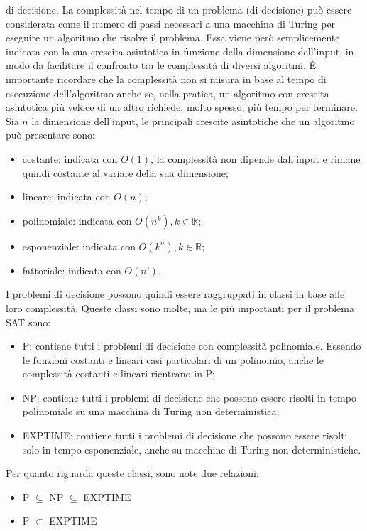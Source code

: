di decisione. La complessità nel tempo di un problema (di decisione) può essere considerata come il numero di passi necessari a una macchina di Turing
per eseguire un algoritmo che risolve il problema.
Essa viene però semplicemente indicata con la sua crescita asintotica in funzione della dimensione dell'input, 
in modo da facilitare il confronto tra le complessità di diversi algoritmi.
È importante ricordare che la complessità non si misura in base al tempo di esecuzione dell'algoritmo anche se,
nella pratica, un algoritmo con crescita asintotica più veloce di un altro richiede, molto spesso, più tempo per terminare.\\
Sia $n$ la dimensione dell'input, le principali crescite asintotiche che un algoritmo può presentare sono:
\begin{itemize}
    \item costante: indicata con $O(1)$, la complessità non dipende dall'input e rimane quindi costante al variare della sua dimensione;
    \item lineare: indicata con $O(n)$;
    \item polinomiale: indicata con $O(n^k), k \in \mathbb{R}$;
    \item esponenziale: indicata con $O(k^n), k \in \mathbb{R}$; 
    \item fattoriale: indicata con $O(n!)$.
\end{itemize}
I problemi di decisione possono quindi essere raggruppati in classi in base alle loro complessità. Queste classi sono molte, ma le 
più importanti per il problema SAT sono:
\begin{itemize}
    \item P: contiene tutti i problemi di decisione con complessità polinomiale. Essendo le funzioni costanti e lineari casi particolari di un polinomio,
    anche le complessità costanti e lineari rientrano in P;
    \item NP: contiene tutti i problemi di decisione che possono essere risolti in tempo polinomiale su una macchina di Turing non deterministica;
    \item EXPTIME: contiene tutti i problemi di decisione che possono essere risolti solo in tempo esponenziale, anche su macchine di Turing non deterministiche.
\end{itemize}
Per quanto riguarda queste classi, sono note due relazioni:
\begin{itemize}
    \item P $\subseteq$ NP $\subseteq$ EXPTIME
    \item P $\subset$ EXPTIME
\end{itemize}
